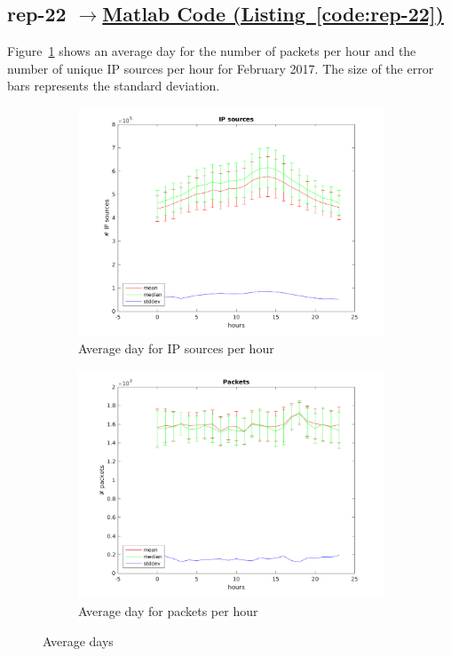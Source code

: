 \documentclass{article}
\newcommand{\codelink}[1]{%
    \hyperref[#1]{\quad$\rightarrow$\enskip Matlab Code (Listing~\ref{#1})}%
}
\begin{document}
\subsection{rep-22 \codelink{code:rep-22}}

Figure~\ref{figure:rep-22} shows an average day for the number of packets per hour and the number of
unique IP sources per hour for February 2017. The size of the error bars represents the standard deviation.

\begin{figure}[h]
    \begin{subfigure}{.5\textwidth}
        \centering
        \includegraphics[width=\textwidth]{../exercise-3/plots/rep_22_ip_s}
        \caption{Average day for IP sources per hour}
    \end{subfigure}
    \begin{subfigure}{.5\textwidth}
        \centering
        \includegraphics[width=\textwidth]{../exercise-3/plots/rep_22_packets}
        \caption{Average day for packets per hour}
    \end{subfigure}
    \caption{\label{figure:rep-22} Average days}
\end{figure}
\end{document}
